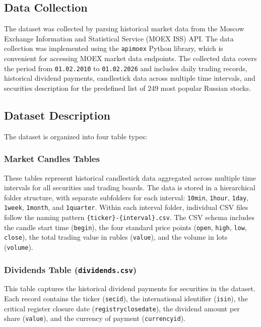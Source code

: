 \documentclass[oneside,final,12pt,a4paper]{extreport}
\begin{document}
\subsection{Data Collection}

The dataset was collected by parsing historical market data from the Moscow Exchange Information and Statistical Service (MOEX ISS) API. The data collection was implemented using the \texttt{apimoex} Python library, which is convenient for accessing MOEX market data endpoints. The collected data covers the period from \texttt{01.02.2010} to \texttt{01.02.2026} and includes daily trading records, historical dividend payments, candlestick data across multiple time intervals, and securities description for the predefined list of 249 most popular Russian stocks.

\subsection{Dataset Description}
The dataset is organized into four table types:

\subsubsection{Market Candles Tables}
These tables represent historical candlestick data aggregated across multiple time intervals for all securities and trading boards. The data is stored in a hierarchical folder structure, with separate subfolders for each interval: \texttt{10min}, \texttt{1hour}, \texttt{1day}, \texttt{1week}, \texttt{1month}, and \texttt{1quarter}. Within each interval folder, individual CSV files follow the naming pattern \texttt{\{ticker\}-\{interval\}.csv}. The CSV schema includes the candle start time (\texttt{begin}), the four standard price points (\texttt{open}, \texttt{high}, \texttt{low}, \texttt{close}), the total trading value in rubles (\texttt{value}), and the volume in lots (\texttt{volume}).

\subsubsection{Dividends Table (\texttt{dividends.csv})}
This table captures the historical dividend payments for securities in the dataset. Each record contains the ticker (\texttt{secid}), the international identifier (\texttt{isin}), the critical register closure date (\texttt{registryclosedate}), the dividend amount per share (\texttt{value}), and the currency of payment (\texttt{currencyid}).
\end{document}
